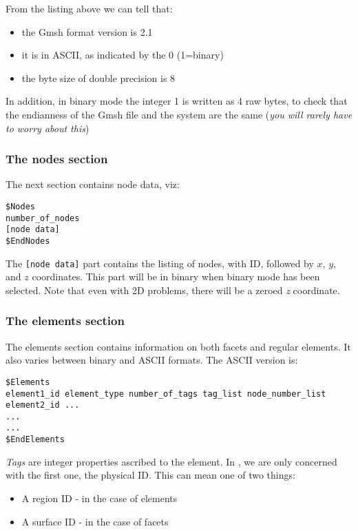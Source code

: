 From the listing above we can tell that:
\begin{itemize}
\item the Gmsh format version is 2.1
\item it is in ASCII, as indicated by the 0 (1=binary)
\item the byte size of double precision is 8
\end{itemize}
In addition, in binary mode the integer 1 is written as 4 raw bytes, to check that the endianness of the Gmsh file and the system are the same (\textit{you will rarely have to worry about this})



\subsubsection*{The nodes section}\label{sect:gmsh_nodes_section}

The next section contains node data, viz:
\begin{lstlisting}
$Nodes
number_of_nodes
[node data]
$EndNodes
\end{lstlisting}

The \lstinline+[node data]+ part contains the listing of nodes, with ID,
followed by $x$, $y$, and $z$ coordinates. This part
will be in binary when binary mode has been selected. Note that even with 2D
problems, there will be a zeroed \textit{z} coordinate.



\subsubsection*{The elements section}\label{sect:gmsh_elements_section}

The elements section contains information on both facets and regular
elements. It also varies between binary and ASCII formats. The ASCII version
is:

\begin{lstlisting}
$Elements
element1_id element_type number_of_tags tag_list node_number_list
element2_id ...
...
...
$EndElements
\end{lstlisting}
\textit{Tags} are integer properties ascribed to the element. In \fluidity,
we are only concerned with the first one, the physical ID. This can mean one
of two things:

\begin{itemize}
\item A region ID - in the case of elements
\item A surface ID - in the case of facets
\end{itemize}

